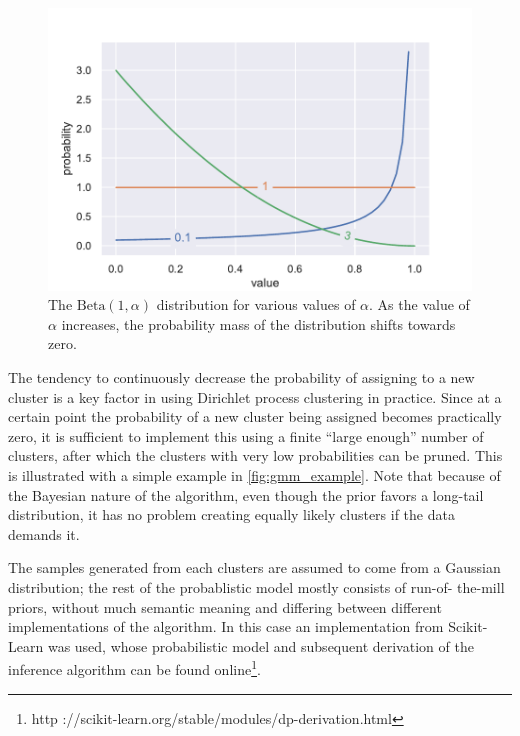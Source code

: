\begin{figure}[tb]
  \centering
  \includegraphics[width=\textwidth]{figures/alpha.pdf}
  \caption{The $\mathrm{Beta}(1, \alpha)$ distribution for various
    values of $\alpha$. As the value of $\alpha$ increases, the probability
    mass of the distribution shifts towards zero.\label{fig:alpha}}
\end{figure}

The tendency to continuously decrease the probability of assigning to a new
cluster is a key factor in using Dirichlet process clustering in practice.
Since at a certain point the probability of a new cluster being assigned
becomes practically zero, it is sufficient to implement this using a finite
``large enough'' number of clusters, after which the clusters with very low
probabilities can be pruned. This is illustrated with a simple example in
\cref{fig:gmm_example}. Note that because of the Bayesian nature of the
algorithm, even though the prior favors a long-tail distribution, it has no
problem creating equally likely clusters if the data demands it.

The samples generated from each clusters are assumed to come from a Gaussian
distribution; the rest of the probablistic model mostly consists of run-of-
the-mill priors, without much semantic meaning and differing between different
implementations of the algorithm. In this case an implementation from Scikit-
Learn\cite{scikit-learn} was used, whose probabilistic model and subsequent
derivation of the inference algorithm can be found online\footnote{http
://scikit-learn.org/stable/modules/dp-derivation.html}.

